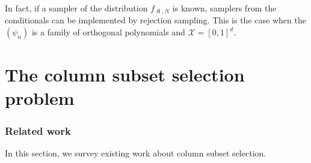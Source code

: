 \documentclass[twoside,11pt]{book}
\numberwithin{theorem}{chapter}
\numberwithin{definition}{chapter}
\numberwithin{proposition}{chapter}
\numberwithin{corollary}{chapter}
\numberwithin{example}{chapter}
\numberwithin{lemma}{chapter}
\DeclareMathOperator*{\KDPP}{\mathfrak{K}}
\begin{document}
In fact, if a sampler of the distribution $f_{\KDPP,N}$ is known, samplers from the conditionals can be implemented by rejection sampling. This is the case when the $(\psi_{n})$ is a family of orthogonal polynomials and $\mathcal{X} = [0,1]^{d}$.  

\clearpage
\chapter{The column subset selection problem}\label{chapter:cssp}
\subsection{Related work}

In this section, we survey existing work about column subset selection.
\end{document}
